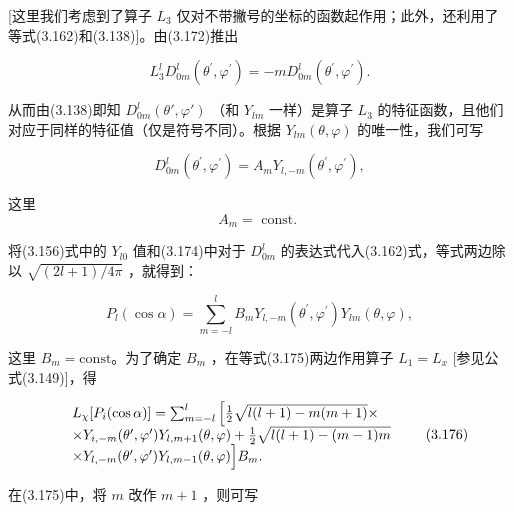 [这里我们考虑到了算子 $L_{3}$ 仅对不带撇号的坐标的函数起作用；此外，还利用了等式(3.162)和(3.138)]。由(3.172)推出

\begin{equation*}
L _ {3} ^ {l} D _ {0 m} ^ {l} \left(\theta^ {\prime}, \varphi^ {\prime}\right) = - m D _ {0 m} ^ {l} \left(\theta^ {\prime}, \varphi^ {\prime}\right).\tag{3.173}
\end{equation*}

从而由(3.138)即知 $D_{0m}^{l}(\theta',\varphi')$ （和 $Y_{lm}$ 一样）是算子 $L_{3}$ 的特征函数，且他们对应于同样的特征值（仅是符号不同）。根据 $Y_{lm}(\theta,\varphi)$ 的唯一性，我们可写

\begin{equation*}
D _ {0 m} ^ {l} \left(\theta^ {\prime}, \varphi^ {\prime}\right) = A _ {m} Y _ {l, - m} \left(\theta^ {\prime}, \varphi^ {\prime}\right),\tag{3.174}
\end{equation*}

这里
\begin{equation*}
A _ {m} = \text { const. }
\end{equation*}

将(3.156)式中的 $Y_{l0}$ 值和(3.174)中对于 $D_{0m}^{l}$ 的表达式代入(3.162)式，等式两边除以 $\sqrt{(2l + 1) / 4\pi}$ ，就得到：

\begin{equation*}
P _ {l} (\cos \alpha) = \sum_ {m = - l} ^ {l} B _ {m} Y _ {l, - m} \left(\theta^ {\prime}, \varphi^ {\prime}\right) Y _ {l m} (\theta , \varphi),\tag{3.175}
\end{equation*}

这里 $B_{m} = \mathrm{const}$。为了确定 $B_{m}$ ，在等式(3.175)两边作用算子 $L_{1} = L_{x}$ [参见公式(3.149)]，得

\begin{equation*}
\begin{array}{r l} & L _ {\chi} [ P _ {i} (\cos \alpha) ] = \sum_ {m = - l} ^ {l} \left[ \frac {1}{2} \sqrt {l (l + 1) - m (m + 1)} \times \right. \\ & \times Y _ {i, - m} (\theta^ {\prime}, \varphi^ {\prime}) Y _ {l, m + 1} (\theta , \varphi) + \frac {1}{2} \sqrt {l (l + 1) - (m - 1) m} \\ & \times Y _ {l, - m} (\theta^ {\prime}, \varphi^ {\prime}) Y _ {l, m - 1} (\theta , \varphi) \Big ] B _ {m}. \end{array} \tag{3.176}
\end{equation*}

在(3.175)中，将 $m$ 改作 $m + 1$ ，则可写

